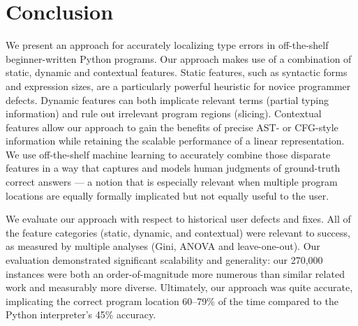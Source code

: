 \documentclass[conference]{IEEEtran}
\begin{document}
\section{Conclusion}

We present an approach for accurately localizing type errors in
off-the-shelf beginner-written Python programs. Our approach makes use of a
combination of static, dynamic and contextual features. Static features,
such as syntactic forms and expression sizes, are a particularly powerful
heuristic for novice programmer defects. Dynamic features can both
implicate relevant terms (partial typing information) and rule out
irrelevant program regions (slicing). Contextual features allow our
approach to gain the benefits of precise AST- or CFG-style information
while retaining the scalable performance of a linear representation.
We use off-the-shelf machine learning to accurately combine those disparate
features in a way that captures and models human judgments of ground-truth
correct answers --- a notion that is especially relevant when multiple
program locations are equally formally implicated but not equally useful to
the user.

We evaluate our approach with respect to historical user defects and fixes.
All of the feature categories (static, dynamic, and contextual) were
relevant to success, as measured by multiple analyses (Gini, ANOVA and
leave-one-out). Our evaluation demonstrated significant scalability and
generality: our 270,000 instances were both an order-of-magnitude more
numerous than similar related work and measurably more diverse. Ultimately,
our approach was quite accurate, implicating the correct program location
60--79\% of the time compared to the Python interpreter's 45\% accuracy.



\end{document}
